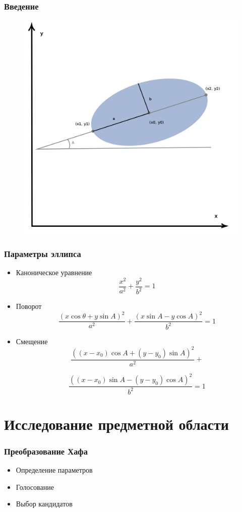 \documentclass[14pt]{beamer}
\begin{document}
\begin{frame}
\frametitle{Введение}
\begin{figure}[H]
  \center
  \includegraphics[width=0.6\linewidth]{ellipseparametres}
\end{figure}
\end{frame}

\begin{frame}
\frametitle{Параметры эллипса}
\begin{itemize}
  \item Каноническое уравнение
  $$ \frac{x^2}{a^2} + \frac{y^2}{b^2} = 1 $$
  \item Поворот
  $$ \frac{(x\cos \theta + y\sin A)^2}{a^2} + \frac{(x\sin A - y\cos A)^2}{b^2} = 1 $$
  \item Смещение
  \small
  $$ \frac{((x - x_0)\cos A + (y - y_0)\sin A)^2}{a^2}  + $$
  
  $$ \frac{((x - x_0)\sin A - (y - y_0)\cos A)^2}{b^2} = 1 $$
  \normalsize
\end{itemize}
\end{frame}

\section{Исследование предметной области}
\begin{frame}
\frametitle{Преобразование Хафа}
\begin{itemize}
  \item Определение параметров
  \item Голосование
  \item Выбор кандидатов   
\end{itemize}
\end{frame}
\end{document}
